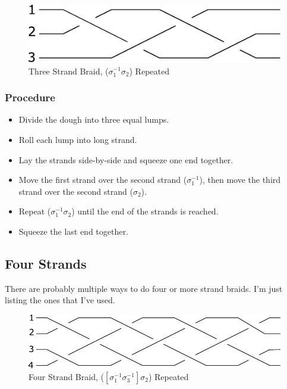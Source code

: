 \documentclass[10pt, openany]{book}
\begin{document}
\begin{figure}[h]
  \center
  \includegraphics{Figures/3-strands.pdf}
  \caption{Three Strand Braid, ($\sigma^{-1}_1\sigma_2$) Repeated}
  \label{fig:3Strand}
\end{figure}

\subsubsection{Procedure}
\begin{itemize}
  \item Divide the dough into three equal lumps.
  \item Roll each lump into long strand.
  \item Lay the strands side-by-side and squeeze one end together.
  \item Move the first strand over the second strand ($\sigma^{-1}_1$), then move the third strand over the second strand ($\sigma_2$).
  \item Repeat ($\sigma^{-1}_1\sigma_2$) until the end of the strands is reached.
  \item Squeeze the last end together.
\end{itemize}

\subsection{Four Strands}
There are probably multiple ways to do four or more strand braids.  I'm just listing the ones that I've used.

\begin{figure}[h]
  \center
  \includegraphics{Figures/4-strands.pdf}
  \caption{Four Strand Braid, ($[\sigma^{-1}_1\sigma^{-1}_3]\sigma_2$) Repeated}
  \label{fig:4Strand}
\end{figure}
\end{document}
